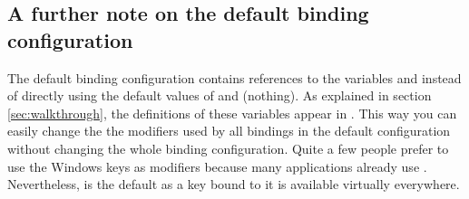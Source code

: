 \subsection{A further note on the default binding configuration}

The default binding configuration contains references to the variables
 and  instead of directly using the default
values of  and \codestr{} (nothing). As explained in
section \ref{sec:walkthrough}, the definitions of these variables
appear in . This way you can easily change the the
modifiers used by all bindings in the default configuration without 
changing the whole binding configuration. Quite a few people prefer 
to use the Windows keys as modifiers because many applications already
use . Nevertheless,  is the default as a key bound 
to it is available virtually everywhere.

